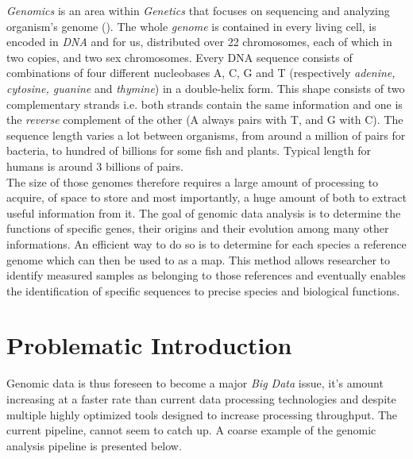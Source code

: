 \textit{Genomics} is an area within \textit{Genetics} that focuses on sequencing and analyzing organism's genome (\cite{genomic}). The whole \textit{genome} is contained in every living cell, is encoded in \textit{DNA} and for us, distributed over 22 chromosomes, each of which in two copies, and two sex chromosomes. Every DNA sequence consists of combinations of four different nucleobases A, C, G and T (respectively \textit{adenine, cytosine, guanine} and \textit{thymine}) in a double-helix form. This shape consists of two complementary strands i.e. both strands contain the same information and one is the \textit{reverse} complement of the other (A always pairs with T, and G with C). The sequence length varies a lot between organisms, from around a million of pairs for bacteria, to hundred of billions for some fish and plants. Typical length for humans is around 3 billions of pairs. \\

The size of those genomes therefore requires a large amount of processing to acquire, of space to store and most importantly, a huge amount of both to extract useful information from it. The goal of genomic data analysis is to determine the functions of specific genes, their origins and their evolution among many other informations. An efficient way to do so is to determine for each species a reference genome which can then be used to as a map. This method allows researcher to identify measured samples as belonging to those references and eventually enables the identification of specific sequences to precise species and biological functions. \\



\section{Problematic Introduction}

Genomic data is thus foreseen to become a major \textit{Big Data} issue, it's amount increasing at a faster rate than current data processing technologies and despite multiple highly optimized tools designed to increase processing throughput. The current pipeline, cannot seem to catch up. A coarse example of the genomic analysis pipeline is presented below. \\


